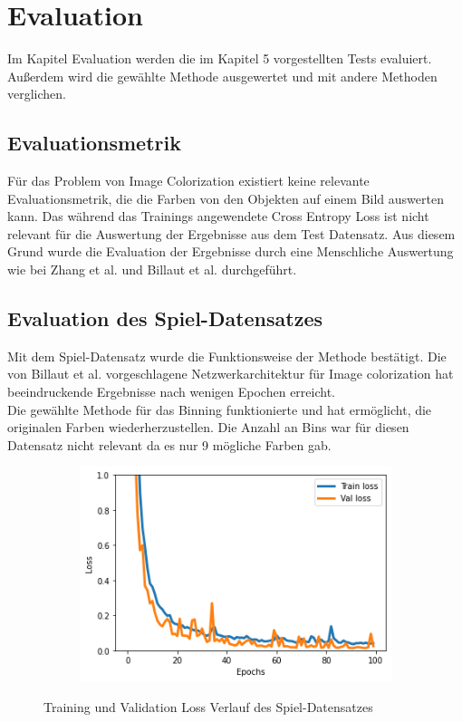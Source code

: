 \chapter{Evaluation}
\label{sec:evaluation}
Im Kapitel Evaluation werden die im Kapitel 5 vorgestellten Tests evaluiert. Außerdem wird die gewählte Methode ausgewertet und
mit andere Methoden verglichen.

\section{Evaluationsmetrik}
Für das Problem von Image Colorization existiert keine relevante Evaluationsmetrik, die die Farben von den Objekten auf einem Bild auswerten kann.
Das während das Trainings angewendete Cross Entropy Loss ist nicht relevant für die Auswertung der Ergebnisse aus dem Test Datensatz. Aus diesem
Grund wurde die Evaluation der Ergebnisse durch eine Menschliche Auswertung wie bei Zhang et al. und Billaut et al.
durchgeführt.

\section{Evaluation des Spiel-Datensatzes}
Mit dem Spiel-Datensatz wurde die Funktionsweise der Methode bestätigt. Die von Billaut et al. vorgeschlagene Netzwerkarchitektur für Image
colorization hat beeindruckende Ergebnisse nach wenigen Epochen erreicht. 
\\
Die gewählte Methode für das Binning funktionierte und hat ermöglicht, die originalen Farben wiederherzustellen. Die Anzahl an 
Bins war für diesen Datensatz nicht relevant da es nur 9 mögliche Farben gab.

\begin{figure}[H]
  \vspace{1cm}
  \centering
  \begin{subfigure}
    \centering
    \includegraphics[width=.5\textwidth]{resources/experiments/toy_100_324_0001.png}
  \end{subfigure}
  \caption{Training und Validation Loss Verlauf des Spiel-Datensatzes}
  \label{image:toy-dataset-loss}
\end{figure}

